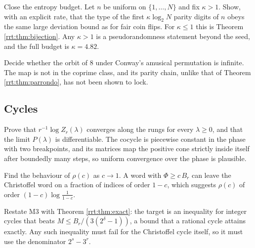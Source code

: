 \begin{problem*}\label{rrt:prob:r6}
Close the entropy budget. Let $n$ be uniform on $\{1,\dots,N\}$ and fix $\kappa>1$. Show, with an explicit rate, that the type of the first $\kappa\log_2 N$ parity digits of $n$ obeys the same large deviation bound as for fair coin flips. For $\kappa\le 1$ this is Theorem \ref{rrt:thm:bijection}. Any $\kappa>1$ is a pseudorandomness statement beyond the seed, and the full budget is $\kappa=4.82$.
\end{problem*}

\begin{problem*}\label{rrt:prob:r7}
Decide whether the orbit of $8$ under Conway's amusical permutation is infinite. The map is not in the coprime class, and its parity chain, unlike that of Theorem \ref{rrt:thm:parrondo}, has not been shown to lock.
\end{problem*}


\subsection{Cycles}
\begin{problem*}\label{rrt:prob:r8}
Prove that $r^{-1}\log Z_r(\lambda)$ converges along the rungs for every $\lambda\ge0$, and that the limit $P(\lambda)$ is differentiable. The cocycle is piecewise constant in the phase with two breakpoints, and its matrices map the positive cone strictly inside itself after boundedly many steps, so uniform convergence over the phase is plausible.
\end{problem*}

\begin{problem*}\label{rrt:prob:r9}
Find the behaviour of $\rho(c)$ as $c\to1$. A word with $\Phi\ge c\,B_r$ can leave the Christoffel word on a fraction of indices of order $1-c$, which suggests $\rho(c)$ of order $(1-c)\log\frac{1}{1-c}$.
\end{problem*}

\begin{problem*}[R10. M3 restated]\label{rrt:prob:r10}
Restate M3 with Theorem \ref{rrt:thm:exact}: the target is an inequality for integer cycles that beats $M\le B_r/(3(2^{\delta}-1))$, a bound that a rational cycle attains exactly. Any such inequality must fail for the Christoffel cycle itself, so it must use the denominator $2^s-3^r$.
\end{problem*}


